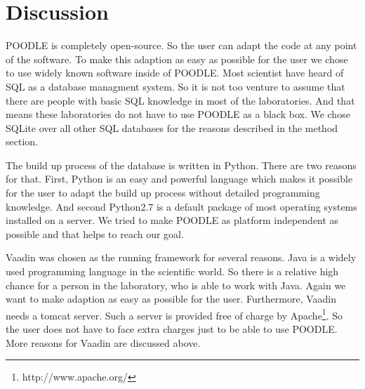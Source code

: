 \documentclass{bioinfo}
\begin{document}



\section{Discussion}

POODLE is completely open-source. So the user can adapt the code at any point of the software. To make 
this adaption as easy as possible for the user we chose to use widely known software inside of POODLE. 
Most scientist have heard of SQL as a database managment system. So it is not too venture to assume 
that there are people with basic SQL knowledge in most of the laboratories. And that means these 
laboratories do not have to use POODLE as a black box. We chose SQLite over all other SQL databases 
for the reasons described in the method section. 

The build up process of the database is written in Python. There are two reasons for that. First, 
Python is an easy and powerful language which makes it possible for the user to adapt the build up 
process without detailed programming knowledge. And second Python2.7 is a default package of most 
operating systems installed on a server. We tried to make POODLE as platform independent as possible 
and that helps to reach our goal.

Vaadin was chosen as the running framework for several reasons. Java is a widely used programming language 
in the scientific world. So there is a relative high chance for a person in the laboratory, who 
is able to work with
Java. Again we want to make adaption as easy as possible for the user. Furthermore, Vaadin needs a 
tomcat server. Such a server is provided free of charge by Apache\footnote{http://www.apache.org/}. 
So the user does not have to face extra charges just to be able to use POODLE. More reasons for 
Vaadin are discussed above.
\end{document}
